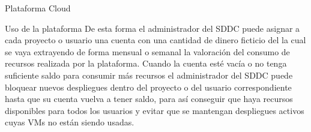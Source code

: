 \begin{subsection}{Plataforma Cloud}
\begin{subsubsection}{Uso de la plataforma}
        De esta forma el administrador del SDDC puede asignar a cada proyecto o usuario una cuenta con una cantidad de dinero ficticio del la cual se vaya extrayendo de forma mensual o semanal la valoración del consumo de recursos realizada por la plataforma. Cuando la cuenta esté vacía o no tenga suficiente saldo para consumir más recursos el administrador del SDDC puede bloquear nuevos despliegues dentro del proyecto o del usuario correspondiente hasta que su cuenta vuelva a tener saldo, para así conseguir que haya recursos disponibles para todos los usuarios y evitar que se mantengan despliegues activos cuyas VMs no están siendo usadas.

    \end{subsubsection}


\end{subsection}
